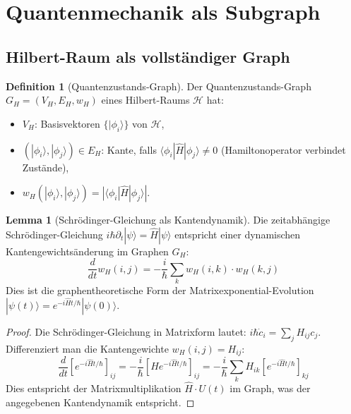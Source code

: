 ﻿\documentclass[a4paper,12pt]{article}
\theoremstyle{definition}
\newtheorem{definition}{Definition}
\newtheorem{lemma}{Lemma}
\begin{document}
\section{Quantenmechanik als Subgraph}

\subsection{Hilbert-Raum als vollst\"andiger Graph}

\begin{definition}[Quantenzustands-Graph]
	Der Quantenzustands-Graph $G_H = (V_H, E_H, w_H)$ eines Hilbert-Raums
	$\mathcal{H}$ hat:
	\begin{itemize}
		\item $V_H$: Basisvektoren $\{|\phi_i\rangle\}$ von $\mathcal{H}$,
		\item $(|\phi_i\rangle, |\phi_j\rangle) \in E_H$: Kante, falls
		      $\langle\phi_i|\hat{H}|\phi_j\rangle \neq 0$
		      (Hamiltonoperator verbindet Zust\"ande),
		\item $w_H(|\phi_i\rangle, |\phi_j\rangle) = |\langle\phi_i|\hat{H}|\phi_j\rangle|$.
	\end{itemize}
\end{definition}

\begin{lemma}[Schr\"odinger-Gleichung als Kantendynamik]
\label{lem:schroedinger}
	Die zeitabh\"angige Schr\"odinger-Gleichung
	$i\hbar \partial_t |\psi\rangle = \hat{H}|\psi\rangle$
	entspricht einer dynamischen Kantengewichts\"anderung im Graphen $G_H$:
	\[
	\frac{d}{dt} w_H(i,j) = -\frac{i}{\hbar} \sum_k w_H(i,k) \cdot w_H(k,j)
	\]
	Dies ist die graphentheoretische Form der Matrixexponential-Evolution
	$|\psi(t)\rangle = e^{-i\hat{H}t/\hbar}|\psi(0)\rangle$.
\end{lemma}

\begin{proof}
	Die Schr\"odinger-Gleichung in Matrixform lautet:
	$i\hbar \dot{c}_i = \sum_j H_{ij} c_j$.
	Differenziert man die Kantengewichte $w_H(i,j) = H_{ij}$:
	\[
	\frac{d}{dt}[e^{-i\hat{H}t/\hbar}]_{ij}
	= -\frac{i}{\hbar}[\hat{H} e^{-i\hat{H}t/\hbar}]_{ij}
	= -\frac{i}{\hbar} \sum_k H_{ik} [e^{-i\hat{H}t/\hbar}]_{kj}
	\]
	Dies entspricht der Matrixmultiplikation $\hat{H} \cdot U(t)$ im Graph,
	was der angegebenen Kantendynamik entspricht.
\end{proof}
\end{document}
